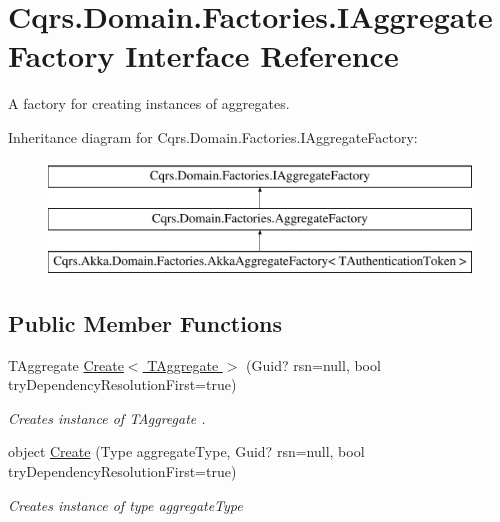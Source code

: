 \hypertarget{interfaceCqrs_1_1Domain_1_1Factories_1_1IAggregateFactory}{}\section{Cqrs.\+Domain.\+Factories.\+I\+Aggregate\+Factory Interface Reference}
\label{interfaceCqrs_1_1Domain_1_1Factories_1_1IAggregateFactory}


A factory for creating instances of aggregates.  


Inheritance diagram for Cqrs.\+Domain.\+Factories.\+I\+Aggregate\+Factory\+:\begin{figure}[H]
\begin{center}
\leavevmode
\includegraphics[height=3.000000cm]{interfaceCqrs_1_1Domain_1_1Factories_1_1IAggregateFactory}
\end{center}
\end{figure}
\subsection*{Public Member Functions}
\begin{DoxyCompactItemize}
\item 
T\+Aggregate \hyperlink{interfaceCqrs_1_1Domain_1_1Factories_1_1IAggregateFactory_a3dcbf8900e0d536da241e2e94f74cdd5_a3dcbf8900e0d536da241e2e94f74cdd5}{Create$<$ T\+Aggregate $>$} (Guid? rsn=null, bool try\+Dependency\+Resolution\+First=true)
\begin{DoxyCompactList}\small\item\em Creates instance of {\itshape T\+Aggregate} . \end{DoxyCompactList}\item 
object \hyperlink{interfaceCqrs_1_1Domain_1_1Factories_1_1IAggregateFactory_ade388f0dfa9c42964392159a4f97fb1e_ade388f0dfa9c42964392159a4f97fb1e}{Create} (Type aggregate\+Type, Guid? rsn=null, bool try\+Dependency\+Resolution\+First=true)
\begin{DoxyCompactList}\small\item\em Creates instance of type {\itshape aggregate\+Type}  \end{DoxyCompactList}\end{DoxyCompactItemize}


